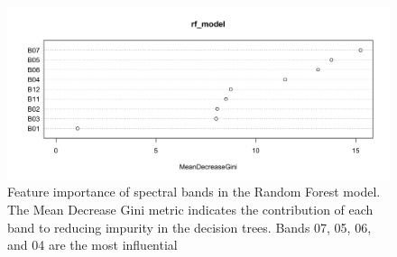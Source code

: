 \documentclass[a4paper,12pt]{article}
\begin{document}
\begin{figure}[H]
    \centering
    \includegraphics[width=1\linewidth]{Random_Forest_Model/Random Forest Prediction on Training Data: Bands used.png}
    \caption[Feature importance of spectral bands in the Random Forest model]{Feature importance of spectral bands in the Random Forest model. The Mean Decrease Gini metric indicates the contribution of each band to reducing impurity in the decision trees. Bands 07, 05, 06, and 04 are the most influential}
    \label{fig:rf bands}
\end{figure}
\end{document}
